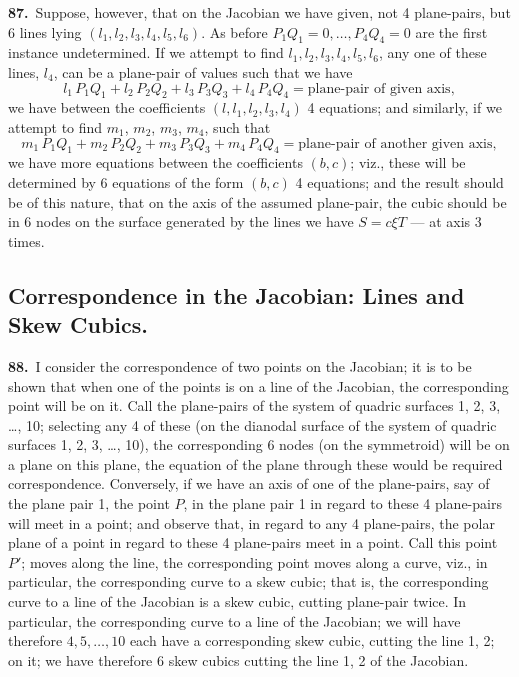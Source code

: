 \documentclass[11pt,a4paper]{article}
\begin{document}
\medskip

\textbf{87.}\ Suppose, however, that on the Jacobian we have given, not 4 plane-pairs, but 6 lines lying $(l_1, l_2, l_3, l_4, l_5, l_6)$. As before $P_1Q_1 = 0, \ldots, P_4Q_4 = 0$ are the first instance undetermined. If we attempt to find $l_1, l_2, l_3, l_4, l_5, l_6$, any one of these lines, $l_4$, can be a plane-pair of values such that we have
\[
l_1\,P_1Q_1 + l_2\,P_2Q_2 + l_3\,P_3Q_3 + l_4\,P_4Q_4 = \text{plane-pair of given axis},
\]
we have between the coefficients $(l, l_1, l_2, l_3, l_4)$ 4 equations; and similarly, if we attempt to find $m_1$, $m_2$, $m_3$, $m_4$, such that
\[
m_1\,P_1Q_1 + m_2\,P_2Q_2 + m_3\,P_3Q_3 + m_4\,P_4Q_4 = \text{plane-pair of another given axis},
\]
we have more equations between the coefficients $(b, c)$; viz., these will be determined by 6 equations of the form $(b, c)$ 4 equations; and the result should be of this nature, that on the axis of the assumed plane-pair, the cubic should be in 6 nodes on the surface generated by the lines we have $S = c\xi T$ — at axis 3 times.

\newpage
\setcounter{page}{168}

\subsection*{Correspondence in the Jacobian: Lines and Skew Cubics.}

\noindent\textbf{88.}\ I consider the correspondence of two points on the Jacobian; it is to be shown that when one of the points is on a line of the Jacobian, the corresponding point will be on it. Call the plane-pairs of the system of quadric surfaces 1, 2, 3, \ldots, 10; selecting any 4 of these (on the dianodal surface of the system of quadric surfaces 1, 2, 3, \ldots, 10), the corresponding 6 nodes (on the symmetroid) will be on a plane on this plane, the equation of the plane through these would be required correspondence. Conversely, if we have an axis of one of the plane-pairs, say of the plane pair 1, the point $P$, in the plane pair 1 in regard to these 4 plane-pairs will meet in a point; and observe that, in regard to any 4 plane-pairs, the polar plane of a point in regard to these 4 plane-pairs meet in a point. Call this point $P'$; moves along the line, the corresponding point moves along a curve, viz., in particular, the corresponding curve to a skew cubic; that is, the corresponding curve to a line of the Jacobian is a skew cubic, cutting plane-pair twice. In particular, the corresponding curve to a line of the Jacobian; we will have therefore $4, 5, \ldots, 10$ each have a corresponding skew cubic, cutting the line 1, 2; on it; we have therefore 6 skew cubics cutting the line 1, 2 of the Jacobian.
\end{document}
